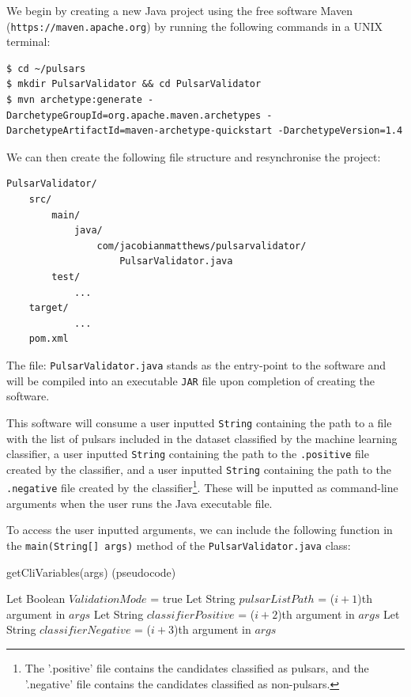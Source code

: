 \documentclass{article}
\begin{document}
We begin by creating a new Java project using the free software Maven (\verb|https://maven.apache.org|) by running the following commands in a UNIX terminal:

\begin{lstlisting}[numbers=none]
$ cd ~/pulsars
$ mkdir PulsarValidator && cd PulsarValidator
$ mvn archetype:generate -DarchetypeGroupId=org.apache.maven.archetypes -DarchetypeArtifactId=maven-archetype-quickstart -DarchetypeVersion=1.4
\end{lstlisting}

We can then create the following file structure and resynchronise the project:

\begin{lstlisting}[numbers=none]
PulsarValidator/
    src/
        main/
            java/
                com/jacobianmatthews/pulsarvalidator/
                    PulsarValidator.java
        test/
            ...
    target/
            ...
    pom.xml
\end{lstlisting}

The file: \verb|PulsarValidator.java| stands as the entry-point to the software and will be compiled into an executable \verb|JAR| file upon completion of creating the software.

This software will consume a user inputted \verb|String| containing the path to a file with the list of pulsars included in the dataset classified by the machine learning classifier, a user inputted \verb|String| containing the path to the \verb|.positive| file created by the classifier, and a user inputted \verb|String| containing the path to the \verb|.negative| file created by the classifier\footnote{The '.positive' file contains the candidates classified as pulsars, and the '.negative' file contains the candidates classified as non-pulsars.}. These will be inputted as command-line arguments when the user runs the Java executable file.

To access the user inputted arguments, we can include the following function in the \verb|main(String[] args)| method of the \verb|PulsarValidator.java| class:

\begin{algorithm}[H]
    \caption{getCliVariables(args) (pseudocode)}
    \begin{algorithmic}
                \State Let Boolean $ValidationMode$ = true
                \State Let String $pulsarListPath$ = ($i+1$)th argument in $args$
                \State Let String $classifierPositive$ = ($i+2$)th argument in $args$
                \State Let String $classifierNegative$ = ($i+3$)th argument in $args$
            \EndIf
        \EndFor
    \end{algorithmic}
\end{algorithm}
\end{document}

